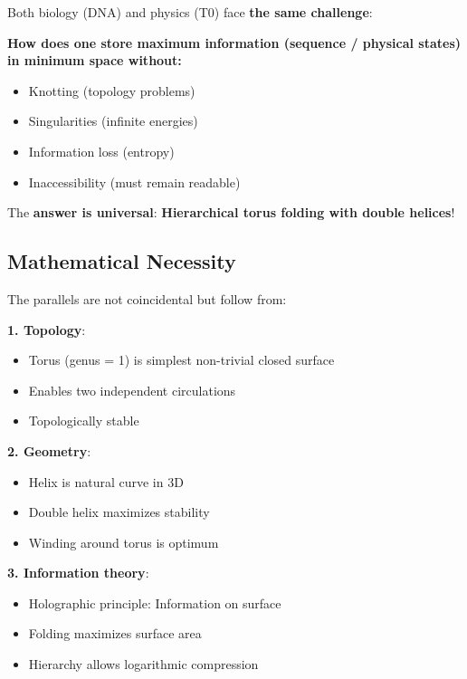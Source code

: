 	\begin{philosophical}
		Both biology (DNA) and physics (T0) face \textbf{the same challenge}:
		
		\vspace{0.3cm}
		
		\textbf{How does one store maximum information (sequence / physical states) in minimum space without:}
		\begin{itemize}
			\item Knotting (topology problems)
			\item Singularities (infinite energies)
			\item Information loss (entropy)
			\item Inaccessibility (must remain readable)
		\end{itemize}
		
		\vspace{0.3cm}
		
		The \textbf{answer is universal}: \textbf{Hierarchical torus folding with double helices}!
	\end{philosophical}
	
	\subsection{Mathematical Necessity}
	
	The parallels are not coincidental but follow from:
	
	\textbf{1. Topology}:
	\begin{itemize}
		\item Torus (genus = 1) is simplest non-trivial closed surface
		\item Enables two independent circulations
		\item Topologically stable
	\end{itemize}
	
	\textbf{2. Geometry}:
	\begin{itemize}
		\item Helix is natural curve in 3D
		\item Double helix maximizes stability
		\item Winding around torus is optimum
	\end{itemize}
	
	\textbf{3. Information theory}:
	\begin{itemize}
		\item Holographic principle: Information on surface
		\item Folding maximizes surface area
		\item Hierarchy allows logarithmic compression
	\end{itemize}
	
